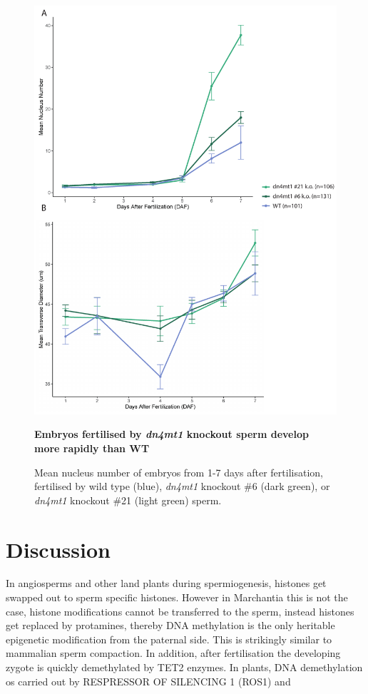 \begin{figure}[htbp!] 
\centering    
    \includegraphics[width=1\textwidth]{Chapter3/Figs/Figure11_nucleus_number.pdf}
\caption{\textbf{Embryos fertilised by \textit{dn4mt1} knockout sperm develop more rapidly than WT}}
\label{fig:nucleus_number}
\captionsetup{font=small}
    \caption*{Mean nucleus number of embryos from 1-7 days after fertilisation, fertilised by wild type (blue), \textit{dn4mt1} knockout \#6 (dark green), or \textit{dn4mt1} knockout \#21 (light green) sperm. }
\end{figure}

\clearpage


\section{Discussion}

In angiosperms and other land plants during spermiogenesis, histones get swapped out to  sperm specific histones. However in Marchantia this is not the case, histone modifications cannot be transferred to the  sperm, instead histones get replaced by protamines, thereby DNA methylation is the only heritable epigenetic modification from the paternal side. This is strikingly similar to mammalian sperm compaction. In addition, after fertilisation the developing zygote is quickly demethylated by TET2 enzymes. In plants, DNA demethylation os carried out by RESPRESSOR OF SILENCING 1 (ROS1) and 

